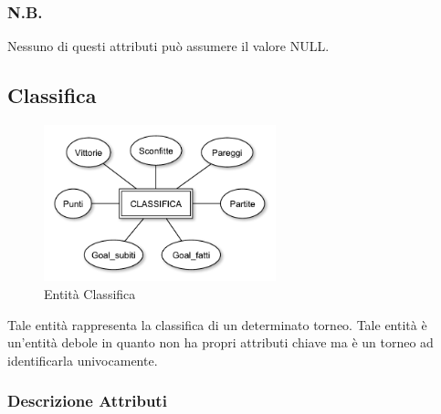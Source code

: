 		\subsubsection*{N.B.}
		Nessuno di questi attributi può assumere il valore NULL.
	
	\subsection{Classifica}
	
		\begin{figure}[h]
			\centering
			\includegraphics[width=0.6\textwidth]
			{immagini/10-classifica}
			
			\caption{Entità Classifica}
		\end{figure}
		
		Tale entità rappresenta la classifica di un determinato torneo. Tale entità è un'entità debole in quanto non ha propri attributi chiave ma è un torneo ad identificarla univocamente.
		
		\subsubsection*{Descrizione Attributi}
		
